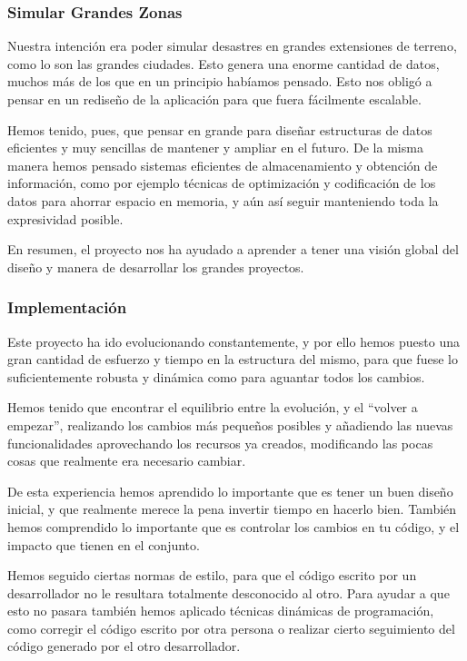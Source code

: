 \subsubsection*{Simular Grandes Zonas}

Nuestra intención era poder simular desastres en grandes extensiones de terreno,
como lo son las grandes ciudades. Esto genera una enorme cantidad de datos,
muchos más de los que en un principio habíamos pensado. Esto nos obligó a
pensar en un rediseño de la aplicación para que fuera fácilmente escalable.

Hemos tenido, pues, que pensar en grande para diseñar estructuras de datos
eficientes y muy sencillas de mantener y ampliar en el futuro. De la misma
manera hemos pensado sistemas eficientes de almacenamiento y obtención de
información, como por ejemplo técnicas de optimización y codificación de los
datos para ahorrar espacio en memoria, y aún así seguir manteniendo toda la
expresividad posible.

En resumen, el proyecto nos ha ayudado a aprender a tener una visión global del
diseño y manera de desarrollar los grandes proyectos.

\subsubsection*{Implementación}

Este proyecto ha ido evolucionando constantemente, y por ello hemos puesto una
gran cantidad de esfuerzo y tiempo en la estructura del mismo, para que fuese lo
suficientemente robusta y dinámica como para aguantar todos los cambios.

Hemos tenido que encontrar el equilibrio entre la evolución, y el ``volver a
empezar'', realizando los cambios más pequeños posibles y añadiendo las
nuevas funcionalidades aprovechando los recursos ya creados, modificando las
pocas cosas que realmente era necesario cambiar.

De esta experiencia hemos aprendido lo importante que es tener un buen diseño
inicial, y que realmente merece la pena invertir tiempo en hacerlo bien.
También hemos comprendido lo importante que es controlar los cambios en tu
código, y el impacto que tienen en el conjunto.

Hemos seguido ciertas normas de estilo, para que el código escrito por un
desarrollador no le resultara totalmente desconocido al otro. Para ayudar a que
esto no pasara también hemos aplicado técnicas dinámicas de programación, como
corregir el código escrito por otra persona o realizar cierto seguimiento del
código generado por el otro desarrollador.

